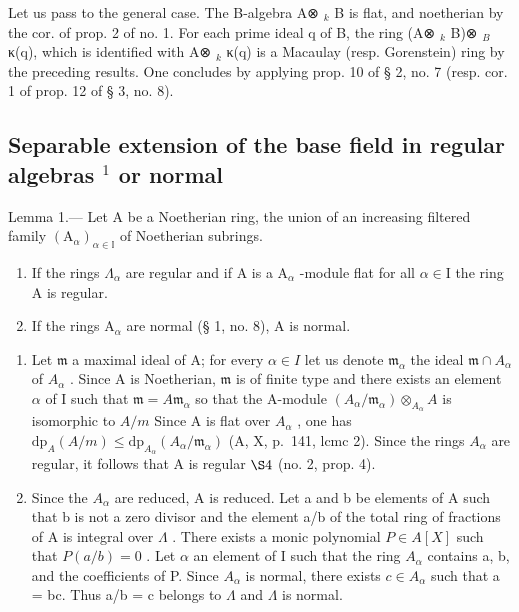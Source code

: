 Let us pass to the general case. The B-algebra A⊗ \(_{k}\) B is flat, and noetherian by the cor. of prop. 2 of no. 1. For each prime ideal q of B, the ring (A⊗ \(_{k}\) B)⊗ \(_{B}\) κ(q), which is identified with A⊗ \(_{k}\) κ(q) is a Macaulay (resp. Gorenstein) ring by the preceding results. One concludes by applying prop. 10 of § 2, no. 7 (resp. cor. 1 of prop. 12 of § 3, no. 8).

\subsection{\texorpdfstring{Separable extension of the base field in regular algebras \(^{1}\) or normal}{Separable extension of the base field in regular or normal algebras (1)}}

Lemma 1.--- Let A be a Noetherian ring, the union of an increasing filtered family \((\mathrm{A}_{\alpha})_{\alpha\in\mathbb{I}}\) of Noetherian subrings.

\begin{enumerate}
\def\labelenumi{\alph{enumi})}
\item
  If the rings \(\Lambda_{\alpha}\) are regular and if A is a \(\mathrm{A}_{\alpha}\) -module flat for all \(\alpha \in \mathrm{I}\) the ring A is regular.
\item
  If the rings \(\mathrm{A}_{\alpha}\) are normal (§ 1, no. 8), A is normal.
\end{enumerate}

\begin{enumerate}
\def\labelenumi{\alph{enumi})}
\item
  Let \(\mathfrak{m}\) a maximal ideal of A; for every \(\alpha \in I\) let us denote \(\mathfrak{m}_{\alpha}\) the ideal \(\mathfrak{m} \cap A_{\alpha}\) of \(A_{\alpha}\) . Since A is Noetherian, \(\mathfrak{m}\) is of finite type and there exists an element \(\alpha\) of I such that \(\mathfrak{m} = A\mathfrak{m}_{\alpha}\) so that the A-module \((A_{\alpha}/\mathfrak{m}_{\alpha}) \otimes_{A_{\alpha}} A\) is isomorphic to \(A/m\) Since A is flat over \(A_{\alpha}\) , one has \(\mathrm{dp}_{A}(A/m) \leqslant \mathrm{dp}_{A_{\alpha}}(A_{\alpha}/\mathfrak{m}_{\alpha})\) (A, X, p.~141, lcmc 2). Since the rings \(A_{\alpha}\) are regular, it follows that A is regular \(\S 4\) (no. 2, prop. 4).
\item
  Since the \(A_{\alpha}\) are reduced, A is reduced. Let a and b be elements of A such that b is not a zero divisor and the element a/b of the total ring of fractions of A is integral over \(\Lambda\) . There exists a monic polynomial \(P \in A[X]\) such that \(P(a/b) = 0\) . Let \(\alpha\) an element of I such that the ring \(A_{\alpha}\) contains a, b, and the coefficients of P. Since \(A_{\alpha}\) is normal, there exists \(c \in A_{\alpha}\) such that a = bc. Thus a/b = c belongs to \(\Lambda\) and \(\Lambda\) is normal.
\end{enumerate}

